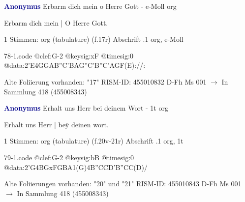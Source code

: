 \documentclass[twocolumn]{book}
\begin{document}
\newline \par \vspace{7pt} \textcolor{darkblue}{\textbf{Anonymus  }}
\newline Erbarm dich mein o Herre Gott - e-Moll
\newline org
\newline \begin{itshape}[f.17r, at left:] Erbarm dich mein | O Herre Gott.\end{itshape} 
\newline \textcolor{darkblue}{}  1 Stimmen: org (tabulature)  (f.17r)
\newline Abschrift
.1  org, e-Moll  
\begin{filecontents*}{78-1.code}
@clef:G-2
@keysig:xF
@timesig:0
@data:2'E4GGAB''C'BAG''C'B''C'AGF(E)://:
\end{filecontents*}
\newline
%
\newline Alte Foliierung vorhanden: "17"
\newline RISM-ID: 455010832
\newline D-Fh  Ms 001
\newline $\rightarrow$ In Sammlung 418 (455008343)
      
\newline \par \vspace{7pt} \textcolor{darkblue}{\textbf{Anonymus  }}
\newline Erhalt uns Herr bei deinem Wort - 1t
\newline org
\newline \begin{itshape}[f.20r, at left:] Erhalt uns Herr | beÿ deinen wort.\end{itshape} 
\newline \textcolor{darkblue}{}  1 Stimmen: org (tabulature)  (f.20v-21r)
\newline Abschrift
.1  org, 1t  
\begin{filecontents*}{79-1.code}
@clef:G-2
@keysig:bB
@timesig:0
@data:2'G4BGxFGBA1(G)4B''CCD'B''CC(D)/
\end{filecontents*}
\newline
%
\newline Alte Foliierungen vorhanden: "20" und "21"
\newline RISM-ID: 455010843
\newline D-Fh  Ms 001
\newline $\rightarrow$ In Sammlung 418 (455008343)
      
\end{document}
